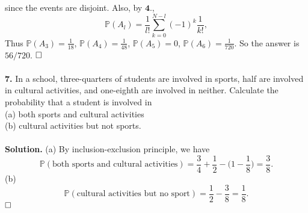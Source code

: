 \documentclass[12pt]{article}
\begin{document}
since the events are disjoint. Also, by $\textbf{4.}$, 
\begin{equation*}
\mathbb{P}(A_{l})=\frac{1}{l!}\sum_{k=0}^{N-l}(-1)^k\frac{1}{k!},
\end{equation*}
Thus $\mathbb{P}(A_3)=\frac{1}{18}$, $\mathbb{P}(A_4)=\frac{1}{48}$, $\mathbb{P}(A_5)=0$, $\mathbb{P}(A_6)=\frac{1}{720}$. So the answer is $56/720$.
$\hspace{\fill}\square$
\\ \\
\textbf{7. } In a school, three-quarters of students are involved in sports, half are involved in cultural activities, and one-eighth are involved in neither. Calculate the probability that a student is involved in\\
(a) both sports and cultural activities\\
(b) cultural activities but not sports.\\
\\
\textbf{Solution.} (a) By inclusion-exclusion principle, we have
\begin{equation*}
\mathbb{P}(\text{both sports and cultural activities})=\frac{3}{4}+\frac{1}{2}-\Big(1-\frac{1}{8}\Big)=\frac{3}{8}.
\end{equation*}
(b)
\begin{equation*}
\mathbb{P}(\text{cultural activities but no sport})=\frac{1}{2}-\frac{3}{8}=\frac{1}{8}.
\end{equation*}
$\hspace{\fill}\square$
\end{document}
